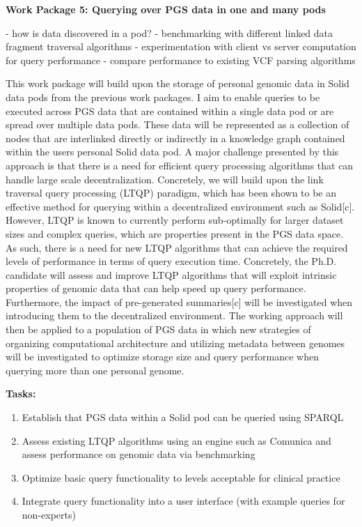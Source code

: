 \documentclass[11pt]{article}
\begin{document}
\textbf{Work Package 5: Querying over PGS data in one and many pods}

- how is data discovered in a pod?
- benchmarking with different linked data fragment traversal algorithms
- experimentation with client vs server computation for query performance
- compare performance to existing VCF parsing algorithms

This work package will build upon the storage of personal genomic data in Solid data pods from the previous work packages. 
I aim to enable queries to be executed across PGS data that are contained within a single data pod or are spread over multiple data pods. 
These data will be represented as a collection of nodes that are interlinked directly or indirectly in a knowledge graph contained within the user\textquotesingle s personal Solid data pod. 
A major challenge presented by this approach is that there is a need for efficient query processing algorithms that can handle large scale decentralization. 
Concretely, we will build upon the link traversal query processing (LTQP) paradigm, which has been shown to be an effective method for querying within a decentralized environment such as Solid[c]. 
However, LTQP is known to currently perform sub-optimally for larger dataset sizes and complex queries, which are properties present in the PGS data space. 
As such, there is a need for new LTQP algorithms that can achieve the required levels of performance in terms of query execution time. 
Concretely, the Ph.D. candidate will assess and improve LTQP algorithms that will exploit intrinsic properties of genomic data that can help speed up query performance. 
Furthermore, the impact of pre-generated summaries[c] will be investigated when introducing them to the decentralized environment. 
The working approach will then be applied to a population of PGS data in which new strategies of organizing computational architecture and utilizing metadata between genomes will be investigated to optimize storage size and query performance when querying more than one personal genome.

\textbf{Tasks:} 
\begin{enumerate}
	\item Establish that PGS data within a Solid pod can be queried using SPARQL
	\item Assess existing LTQP algorithms using an engine such as Comunica and assess performance on genomic data via benchmarking
	\item Optimize basic query functionality to levels acceptable for clinical practice
	\item Integrate query functionality into a user interface (with example queries for non-experts)
\end{enumerate}
\end{document}
